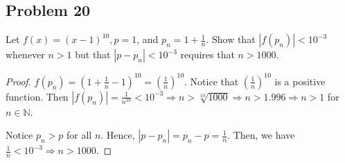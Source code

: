 \documentclass{article}
\begin{document}
\subsection*{Problem 20}
Let $f(x) = (x-1)^{10}, p=1$, and $p_n = 1+\frac{1}{n}$. Show that $|f(p_n)|<10^{-3}$ whenever $n>1$ 
but that $|p-p_n|<10^{-3}$ requires that $n>1000$.

\begin{proof}
    $f(p_n) = (1+\frac{1}{n}-1)^{10} = \left(\frac{1}{n}\right)^{10}$. Notice that 
    $\left(\frac{1}{n}\right)^{10}$ is a positive function. Then $|f(p_n)| = \frac{1}{n^{10}} < 
    10^{-3} \Rightarrow n > \sqrt[10]{1000} \Rightarrow n > 1.996 \Rightarrow n > 1$ for $n \in 
    \mathbb{N}$.

    Notice $p_n > p$ for all $n$. Hence, $|p-p_n| = p_n - p = \frac{1}{n}$. Then, we have 
    $\frac{1}{n} < 10^{-3} \Rightarrow n > 1000$.
\end{proof}
\end{document}
